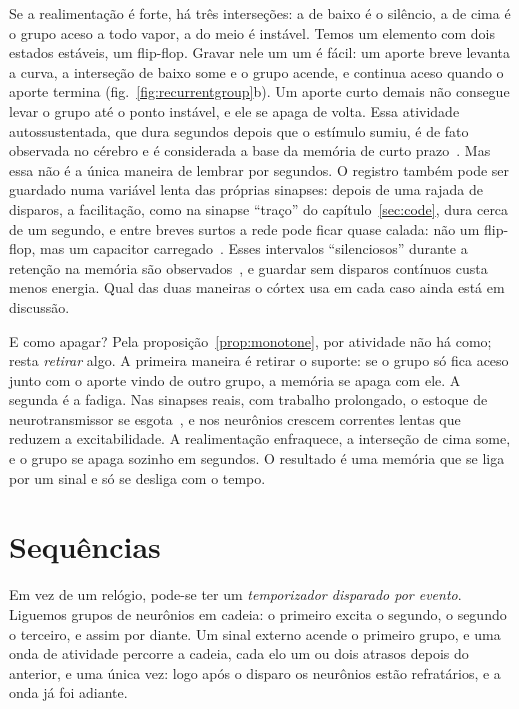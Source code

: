 Se a realimentação é forte, há três interseções: a de baixo é o silêncio, a de cima é o grupo aceso a todo vapor, a do meio é instável. Temos um elemento com dois estados estáveis, um flip-flop. Gravar nele um um é fácil: um aporte breve levanta a curva, a interseção de baixo some e o grupo acende, e continua aceso quando o aporte termina (fig.~\ref{fig:recurrentgroup}b). Um aporte curto demais não consegue levar o grupo até o ponto instável, e ele se apaga de volta. Essa atividade autossustentada, que dura segundos depois que o estímulo sumiu, é de fato observada no cérebro e é considerada a base da memória de curto prazo~\cite{Wang2001}. Mas essa não é a única maneira de lembrar por segundos. O registro também pode ser guardado numa variável lenta das próprias sinapses: depois de uma rajada de disparos, a facilitação, como na sinapse ``traço'' do capítulo~\ref{sec:code}, dura cerca de um segundo, e entre breves surtos a rede pode ficar quase calada: não um flip-flop, mas um capacitor carregado~\cite{Mongillo2008}. Esses intervalos ``silenciosos'' durante a retenção na memória são observados~\cite{Stokes2015}, e guardar sem disparos contínuos custa menos energia. Qual das duas maneiras o córtex usa em cada caso ainda está em discussão.

E como apagar? Pela proposição~\ref{prop:monotone}, por atividade não há como; resta \emph{retirar} algo. A primeira maneira é retirar o suporte: se o grupo só fica aceso junto com o aporte vindo de outro grupo, a memória se apaga com ele. A segunda é a fadiga. Nas sinapses reais, com trabalho prolongado, o estoque de neurotransmissor se esgota~\cite{Tsodyks1997}, e nos neurônios crescem correntes lentas que reduzem a excitabilidade. A realimentação enfraquece, a interseção de cima some, e o grupo se apaga sozinho em segundos. O resultado é uma memória que se liga por um sinal e só se desliga com o tempo.

\section{Sequências}

Em vez de um relógio, pode-se ter um \emph{temporizador disparado por evento}. Liguemos grupos de neurônios  em cadeia: o primeiro excita o segundo, o segundo o terceiro, e assim por diante. Um sinal externo acende o primeiro grupo, e uma onda de atividade percorre a cadeia, cada elo um ou dois atrasos depois do anterior, e uma única vez: logo após o disparo os neurônios estão refratários, e a onda já foi adiante.

